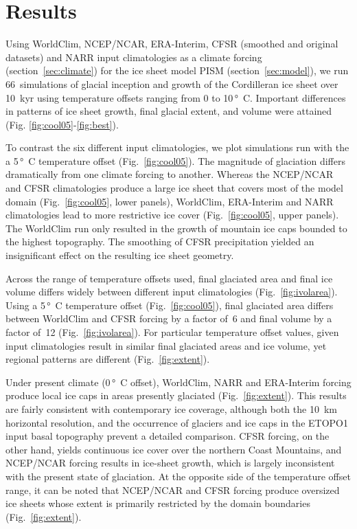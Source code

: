 \section{Results}
\label{sec:results}

Using WorldClim, NCEP/NCAR, ERA-Interim, CFSR (smoothed and original datasets) and NARR input climatologies as a climate forcing (section~\ref{sec:climate}) for the ice sheet model PISM (section~\ref{sec:model}), we run 66~simulations of glacial inception and growth of the Cordilleran ice sheet over 10~kyr using temperature offsets ranging from 0 to 10\,\unit{\degree C}. Important differences in patterns of ice sheet growth, final glacial extent, and volume were attained (Fig. \ref{fig:cool05}-\ref{fig:best}).

To contrast the six different input climatologies, we plot simulations run with the a 5\,\unit{\degree C} temperature offset (Fig.~\ref{fig:cool05}). The magnitude of glaciation differs dramatically from one climate forcing to another. Whereas the NCEP/NCAR and CFSR climatologies produce a large ice sheet that covers most of the model domain (Fig.~\ref{fig:cool05}, lower panels), WorldClim, ERA-Interim and NARR climatologies lead to more restrictive ice cover (Fig.~\ref{fig:cool05}, upper panels). The WorldClim run only resulted in the growth of mountain ice caps bounded to the highest topography. The smoothing of CFSR precipitation yielded an insignificant effect on the resulting ice sheet geometry.

Across the range of temperature offsets used, final glaciated area and final ice volume differs widely between different input climatologies (Fig.~\ref{fig:ivolarea}). Using a 5\,\unit{\degree C} temperature offset (Fig.~\ref{fig:cool05}), final glaciated area differs between WorldClim and CFSR forcing by a factor of~6 and final volume by a factor of~12 (Fig.~\ref{fig:ivolarea}). For particular temperature offset values, given input climatologies result in similar final glaciated areas and ice volume, yet regional patterns are different (Fig.~\ref{fig:extent}).

Under present climate (0\,\unit{\degree C} offset), WorldClim, NARR and ERA-Interim forcing produce local ice caps in areas presently glaciated (Fig.~\ref{fig:extent}). This results are fairly consistent with contemporary ice coverage, although both the 10~km horizontal resolution, and the occurrence of glaciers and ice caps in the ETOPO1 input basal topography prevent a detailed comparison. CFSR forcing, on the other hand, yields continuous ice cover over the northern Coast Mountains, and NCEP/NCAR forcing results in ice-sheet growth, which is largely inconsistent with the present state of glaciation. At the opposite side of the temperature offset range, it can be noted that NCEP/NCAR and CFSR forcing produce oversized ice sheets whose extent is primarily restricted by the domain boundaries (Fig.~\ref{fig:extent}).

